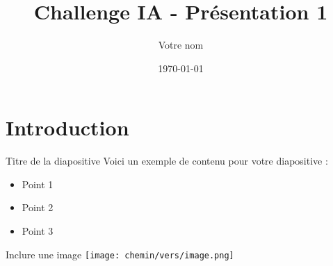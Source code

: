 \documentclass{beamer}
\title{Challenge IA - Présentation 1}
\author{Votre nom}
\date{\today}
\begin{document}
\frame{\titlepage} 

\section{Introduction} 

\begin{frame}{Titre de la diapositive} %
Voici un exemple de contenu pour votre diapositive :
\begin{itemize}
    \item Point 1
    \item Point 2
    \item Point 3
\end{itemize}
\end{frame}

\begin{frame}{Inclure une image}
\texttt{[image: chemin/vers/image.png]}
\end{frame}
\end{document}
